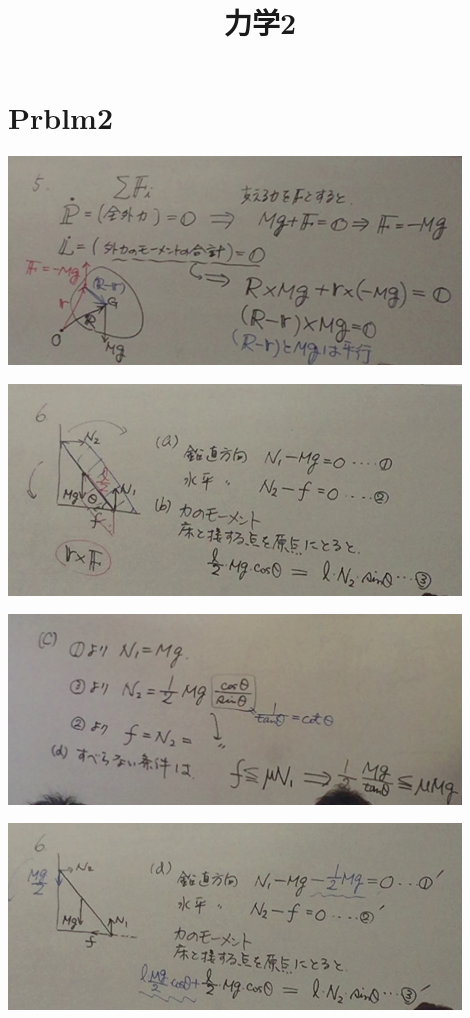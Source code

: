 \documentclass{jsarticle}
\title{力学2}
\begin{document}
\section{Prblm2}
	\begin{center}
		\includegraphics[width=12cm]{5_13_1.JPG}
	\end{center}
	\begin{center}
		\includegraphics[width=12cm]{5_13_2.JPG}
	\end{center}
	\begin{center}
		\includegraphics[width=12cm]{5_13_3.JPG}
	\end{center}
	\begin{center}
		\includegraphics[width=12cm]{5_13_4.JPG}
	\end{center}
\end{document}
